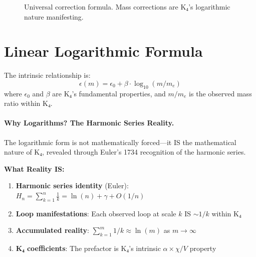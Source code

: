 \documentclass[11pt,a4paper]{book}
\begin{document}
\begin{figure}[h]
\centering
{}
\caption{Universal correction formula. Mass corrections are K₄'s logarithmic nature manifesting.}
\label{fig:universal-correction}
\end{figure}

\section{Linear Logarithmic Formula}

The intrinsic relationship is:
\[
\epsilon(m) = \epsilon_0 + \beta \cdot \log_{10}(m / m_e)
\]
where $\epsilon_0$ and $\beta$ are K₄'s fundamental properties, and $m / m_e$ is the observed mass ratio within K₄.

\paragraph{Why Logarithms? The Harmonic Series Reality.}

The logarithmic form is not mathematically forced—it IS the mathematical nature of K₄, revealed through Euler's 1734 recognition of the harmonic series.

\textbf{What Reality IS:}
\begin{enumerate}
\item \textbf{Harmonic series identity} (Euler): $H_n = \sum_{k=1}^n \frac{1}{k} = \ln(n) + \gamma + O(1/n)$
\item \textbf{Loop manifestations}: Each observed loop at scale $k$ IS $\sim 1/k$ within K₄
\item \textbf{Accumulated reality}: $\sum_{k=1}^m 1/k \approx \ln(m)$ as $m \to \infty$
\item \textbf{K₄ coefficients}: The prefactor is K₄'s intrinsic $\alpha \times \chi/V$ property
\end{enumerate}
\end{document}

